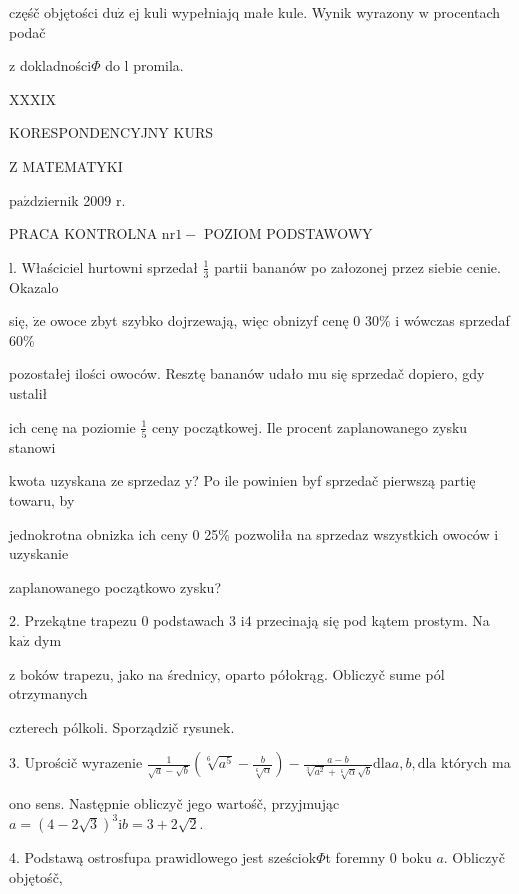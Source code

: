 \documentclass[a4paper,12pt]{article}
\begin{document}
częśč objętości $\mathrm{d}\mathrm{u}\dot{\mathrm{z}}$ ej kuli wypełniajq małe kule. Wynik wyrazony $\mathrm{w}$ procentach podač

$\mathrm{z}$ dokladności$\Phi$ do l promila.







XXXIX

KORESPONDENCYJNY KURS

Z MATEMATYKI

$\mathrm{p}\mathrm{a}\acute{\mathrm{z}}$dziernik 2009 $\mathrm{r}.$

PRACA KONTROLNA $\mathrm{n}\mathrm{r} 1-$ POZIOM PODSTAWOWY

l. Właściciel hurtowni sprzedał $\displaystyle \frac{1}{3}$ partii bananów po załozonej przez siebie cenie. Okazalo

się, $\dot{\mathrm{z}}\mathrm{e}$ owoce zbyt szybko dojrzewają, więc obnizyf cenę $0$ 30\% $\mathrm{i}$ wówczas sprzedaf 60\%

pozostałej ilości owoców. Resztę bananów udało mu się sprzedač dopiero, gdy ustalił

ich cenę na poziomie $\displaystyle \frac{1}{5}$ ceny początkowej. Ile procent zaplanowanego zysku stanowi

kwota uzyskana ze sprzedaz $\mathrm{y}$? Po ile powinien byf sprzedač pierwszą partię towaru, by

jednokrotna obnizka ich ceny $0$ 25\% pozwoliła na sprzedaz wszystkich owoców $\mathrm{i}$ uzyskanie

zaplanowanego początkowo zysku?

2. Przekątne trapezu $0$ podstawach 3 $\mathrm{i}4$ przecinają się pod kątem prostym. Na $\mathrm{k}\mathrm{a}\dot{\mathrm{z}}$ dym

$\mathrm{z}$ boków trapezu, jako na średnicy, oparto półokrąg. Obliczyč sume pól otrzymanych

czterech pólkoli. Sporządzič rysunek.

3. Uprościč wyrazenie $\displaystyle \frac{1}{\sqrt{a}-\sqrt{b}}(\sqrt[6]{a^{5}}-\frac{b}{\sqrt[6]{\alpha}}) -\displaystyle \frac{a-b}{\sqrt[3]{a^{2}}+\sqrt[6]{\alpha}\sqrt{b}} \mathrm{d}\mathrm{l}\mathrm{a}a, b, \mathrm{d}\mathrm{l}\mathrm{a}$ których ma

ono sens. Następnie obliczyč jego wartośč, przyjmując $a=(4-2\sqrt{3})^{3}\mathrm{i} b=3+2\sqrt{2}.$

4. Podstawą ostrosfupa prawidlowego jest sześciok$\Phi$t foremny $0$ boku $a$. Obliczyč objętośč,
\end{document}
